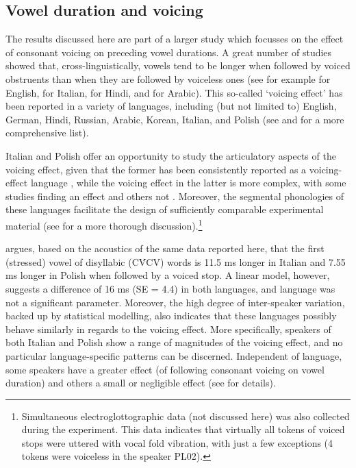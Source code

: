\documentclass[preprint]{JASAnew}
\begin{document}
\hypertarget{vowel-duration-and-voicing}{%
\subsection{Vowel duration and
voicing}\label{vowel-duration-and-voicing}}

The results discussed here are part of a larger study which focusses on
the effect of consonant voicing on preceding vowel durations. A great
number of studies showed that, cross-linguistically, vowels tend to be
longer when followed by voiced obstruents than when they are followed by
voiceless ones (see for example
\citealt{house1953, peterson1960, chen1970, klatt1973, lisker1974, fowler1992}
for English, \citealt{farnetani1986, esposito2002} for Italian,
\citealt{durvasula2012} for Hindi, and \citealt{hussein1994} for
Arabic). This so-called `voicing effect' has been reported in a variety
of languages, including (but not limited to) English, German, Hindi,
Russian, Arabic, Korean, Italian, and Polish (see
\citealt{maddieson1976} and \citealt{begus2017} for a more comprehensive
list).

Italian and Polish offer an opportunity to study the articulatory
aspects of the voicing effect, given that the former has been
consistently reported as a voicing-effect language
\citep{caldognetto1979, farnetani1986, esposito2002}, while the voicing
effect in the latter is more complex, with some studies finding an
effect \citep{slowiaczek1985, nowak2006, malisz2008, coretta2019k} and
others not \citep{keating1984, jassem1989}. Moreover, the segmental
phonologies of these languages facilitate the design of sufficiently
comparable experimental material (see \citealt{coretta2019k} for a more
thorough
discussion).\footnote{Simultaneous electroglottographic data (not discussed here) was also collected during the experiment. This data indicates that virtually all tokens of voiced stops were uttered with vocal fold vibration, with just a few exceptions (4 tokens were voiceless in the speaker PL02).}

\citet{coretta2019k} argues, based on the acoustics of the same data
reported here, that the first (stressed) vowel of disyllabic (CV́CV)
words is 11.5 ms longer in Italian and 7.55 ms longer in Polish when
followed by a voiced stop. A linear model, however, suggests a
difference of 16 ms (SE = 4.4) in both languages, and language was not a
significant parameter. Moreover, the high degree of inter-speaker
variation, backed up by statistical modelling, also indicates that these
languages possibly behave similarly in regards to the voicing effect.
More specifically, speakers of both Italian and Polish show a range of
magnitudes of the voicing effect, and no particular language-specific
patterns can be discerned. Independent of language, some speakers have a
greater effect (of following consonant voicing on vowel duration) and
others a small or negligible effect (see \citealt{coretta2019k} for
details).
\end{document}
